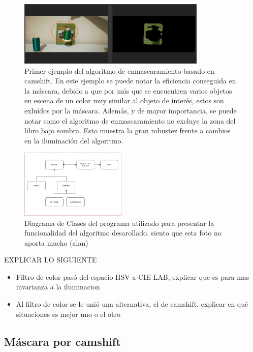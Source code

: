 \begin{figure}
\centering
	\includegraphics[width=0.8\textwidth]{Imagenes/camshift_mask1.png}
	\caption{Primer ejemplo del algoritmo de enmascaramiento basado en camshift. En este ejemplo se puede notar la eficiencia conseguida en la máscara, debido a que por más que se encuentren varios objetos en escena de un color muy similar al objeto de interés, estos son exluídos por la máscara. Además, y de mayor importancia, se puede notar como el algoritmo de enmascaramiento no excluye la zona del libro bajo sombra. Esto muestra la gran robustez frente a cambios en la iluminación del algoritmo.}
	\label{fig:c_mask1}
\end{figure}

\begin{figure}
	\centering
	\includegraphics[width=0.45\textwidth]{Imagenes/classd.png}
	\caption{Diagrama de Clases del programa utilizado para presentar la funcionalidad del algoritmo desarollado. \LARGE{siento que esta foto no aporta mucho (alan)}}
	\label{fig:class}
\end{figure}
EXPLICAR LO SIGUIENTE
\begin{itemize}
\item Filtro de color pasó del espacio HSV a CIE-LAB, explicar que es para mas invarianza a la iluminacion
\item Al filtro de color se le unió una alternativa, el de camshift, explicar en qué situaciones es mejor uno o el otro
\end{itemize}
\subsection{Máscara por camshift}


